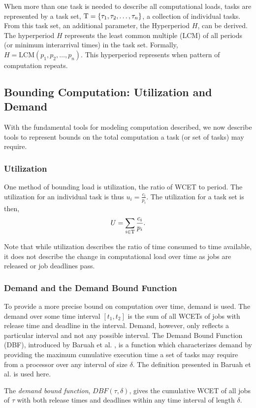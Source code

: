 When more than one task is needed to describe all computational loads, tasks are represented by a task set, $\mathrm{T} = \{\tau_1, \tau_2, \dots, \tau_n\}$, a collection of individual tasks.
From this task set, an additional parameter, the Hyperperiod $H$, can be derived.
The hyperperiod $H$ represents the least common multiple (LCM) of all periods (or minimum interarrival times) in  the task set.
Formally, $H = \text{LCM}(p_1, p_2, \dots, p_n)$.
This hyperperiod represents when pattern of computation repeats.

\subsection{Bounding Computation: Utilization and Demand}

With the fundamental tools for modeling computation described, we now describe tools to represent bounds on the total computation a task (or set of tasks) may require. 

\subsubsection{Utilization}

One method of bounding load is utilization, the ratio of WCET to period.
The utilization for an individual task is thus $u_i = \frac{c_i}{p_i}$.
The utilization for a task set is then,
\begin{equation}
    U = \sum_{i \in \mathrm{T}} \frac{c_i}{p_i}.
\end{equation}

Note that while utilization describes the ratio of time consumed to time available, it does not describe the change in computational load over time as jobs are released or job deadlines pass.

\subsubsection{Demand and the Demand Bound Function}

To provide a more precise bound on computation over time, demand is used.
The demand over some time interval $[t_1,t_2]$ is the sum of all WCETs of jobs with release time and deadline in the interval.
Demand, however, only reflects a particular interval and not any possible interval.
The Demand Bound Function (DBF), introduced by Baruah et al. \cite{baruah_preemptively_1990}, is a function which characterizes demand by providing the maximum cumulative execution time a set of tasks may require from a processor over any interval of size $\delta$. 
The definition presented in Baruah et al. \cite{baruah_preemptively_1990} is used here.
\begin{definition}\label{def:dbf}
    The \textit{demand bound function}, $DBF(\tau,\delta)$, gives the cumulative WCET of all jobs of $\tau$ with both release times and deadlines within any time interval of length $\delta$.
\end{definition}

